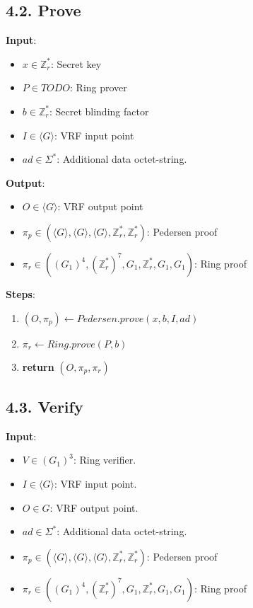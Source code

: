 \documentclass[
]{article}
\providecommand{\tightlist}{%
  \setlength{\itemsep}{0pt}\setlength{\parskip}{0pt}}
\begin{document}
\hypertarget{prove-2}{%
\subsection{4.2. Prove}\label{prove-2}}

\textbf{Input}:

\begin{itemize}
\tightlist
\item
  \(x \in \mathbb{Z}^*_r\): Secret key
\item
  \(P \in TODO\): Ring prover
\item
  \(b \in \mathbb{Z}^*_r\): Secret blinding factor
\item
  \(I \in \langle G \rangle\): VRF input point
\item
  \(ad \in \Sigma^*\): Additional data octet-string.
\end{itemize}

\textbf{Output}:

\begin{itemize}
\tightlist
\item
  \(O \in \langle G \rangle\): VRF output point
\item
  \(\pi_p \in (\langle G \rangle, \langle G \rangle, \langle G \rangle, \mathbb{Z}^*_r, \mathbb{Z}^*_r)\):
  Pedersen proof
\item
  \(\pi_r \in ((G_1)^4, (\mathbb{Z}^*_r)^7, G_1, \mathbb{Z}^*_r, G_1, G_1)\):
  Ring proof
\end{itemize}

\textbf{Steps}:

\begin{enumerate}
\def\labelenumi{\arabic{enumi}.}
\tightlist
\item
  \((O, \pi_p) \leftarrow Pedersen.prove(x, b, I, ad)\)
\item
  \(\pi_r \leftarrow Ring.prove(P, b)\)
\item
  \textbf{return} \((O, \pi_p, \pi_r)\)
\end{enumerate}

\hypertarget{verify-2}{%
\subsection{4.3. Verify}\label{verify-2}}

\textbf{Input}:

\begin{itemize}
\tightlist
\item
  \(V \in (G_1)^3\): Ring verifier.
\item
  \(I \in \langle G \rangle\): VRF input point.
\item
  \(O \in G\): VRF output point.
\item
  \(ad \in \Sigma^*\): Additional data octet-string.
\item
  \(\pi_p \in (\langle G \rangle, \langle G \rangle, \langle G \rangle, \mathbb{Z}^*_r, \mathbb{Z}^*_r)\):
  Pedersen proof
\item
  \(\pi_r \in ((G_1)^4, (\mathbb{Z}^*_r)^7, G_1, \mathbb{Z}^*_r, G_1, G_1)\):
  Ring proof
\end{itemize}
\end{document}
